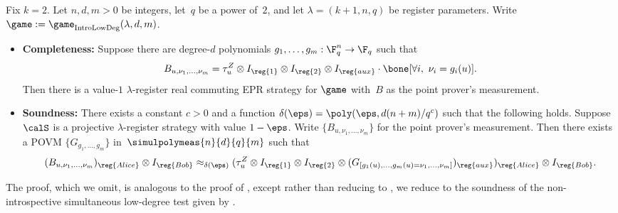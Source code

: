 \begin{theorem}\label{thm:big-simultaneous-planes-low-degree}
Fix $k = 2$.
Let $n, d, m>0$ be integers, let~$q$ be a power of~$2$,
and let $\lambda = (k+1, n, q)$ be register parameters.
Write $\game := \game_{\mathrm{IntroLowDeg}}(\lambda, d, m)$.
\begin{itemize}
\item[$\circ$] \textbf{Completeness:}
		Suppose there are degree-$d$ polynomials $g_1, \ldots, g_m:\F_q^{n}\rightarrow \F_q$ such that
		\begin{equation*}
			B_{u, \nu_1, \ldots, \nu_m} = \tau_u^Z \otimes I_{\reg{1}} \otimes I_{\reg{2}} \otimes I_{\reg{aux}} \cdot \bone[\forall i,~\nu_i = g_i(u)].
		\end{equation*}
		Then there is a value-$1$ $\lambda$-register real
                commuting EPR strategy for $\game$ with~$B$ as the point prover's measurement.
\item[$\circ$] \textbf{Soundness:}
		There exists a constant $c > 0$ and a function $\delta(\eps) = \poly(\eps, d(n+m)/q^c)$ such that the following holds.
		Suppose $\calS$ is a projective $\lambda$-register strategy with value $1-\eps$.
		Write $\{B_{u, \nu_1, \ldots, \nu_m}\}$ for the point prover's measurement.
		Then there exists a POVM $\{G_{g_1, \ldots, g_m}\}$
                in~$\simulpolymeas{n}{d}{q}{m}$ such that
		\begin{equation*}
			(B_{u, \nu_1, \ldots, \nu_m})_{\reg{Alice}} \otimes I_{\reg{Bob}}
				\approx_{\delta(\eps)} (\tau^Z_{u}\otimes I_{\reg{1}} \otimes I_{\reg{2}}
					\otimes (G_{[g_1(u), \ldots, g_m(u) = \nu_1, \ldots, \nu_m]})_{\reg{aux}})_{\reg{Alice}} \otimes I_{\reg{Bob}}.
		\end{equation*}
\end{itemize}
\end{theorem}

The proof, which we omit,
is analogous to the proof of ,
except rather than reducing to ,
we reduce to the soundness of the non-introspective simultaneous low-degree test given by .



